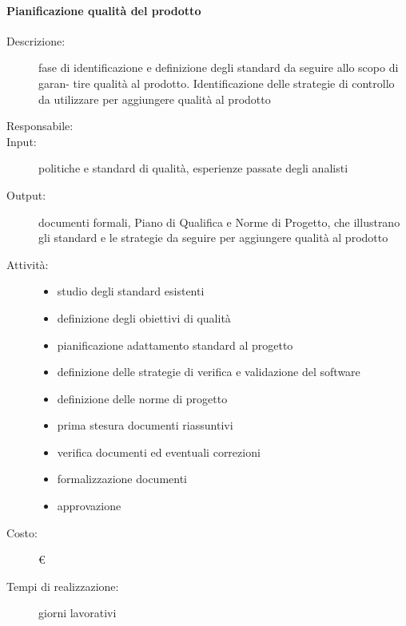 \paragraph{Pianificazione qualità del prodotto}
\begin{description}
\item[Descrizione:] fase di identificazione e definizione degli standard da seguire allo scopo di garan-
tire qualità al prodotto. Identificazione delle strategie di controllo da utilizzare per
aggiungere qualità al prodotto

\item[Responsabile:]  

\item[Input:] politiche e standard di qualità, esperienze passate degli analisti
\item[Output:] documenti formali, Piano di Qualifica e Norme di Progetto, che illustrano gli
standard e le strategie da seguire per aggiungere qualità al prodotto

\item[Attività:]
\begin{itemize}
\item studio degli standard esistenti
\item definizione degli obiettivi di qualità
\item pianificazione adattamento standard al progetto
\item definizione delle strategie di verifica e validazione del software
\item definizione delle norme di progetto
\item prima stesura documenti riassuntivi
\item verifica documenti ed eventuali correzioni
\item formalizzazione documenti
\item approvazione
\end{itemize}
\item[Costo:] \euro 
\item[Tempi di realizzazione:]  giorni lavorativi
\end{description}



